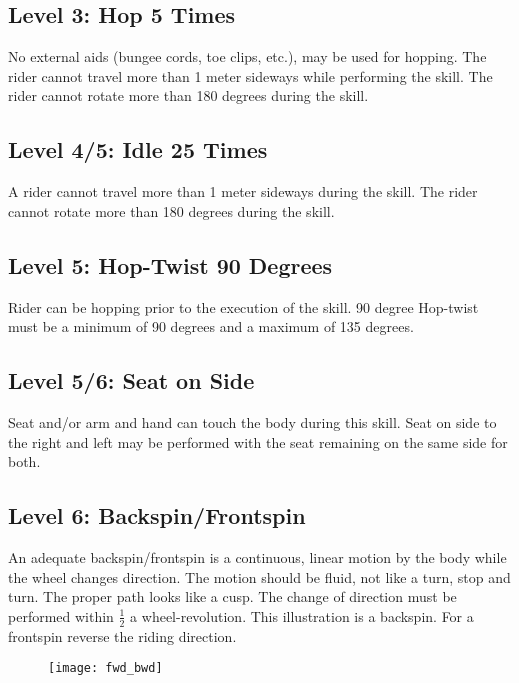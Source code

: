 \subsection{Level 3: Hop 5 Times}
No external aids (bungee cords, toe clips, etc.), may be used for hopping.
The rider cannot travel more than 1 meter sideways while performing the skill.
The rider cannot rotate more than 180 degrees during the skill.

\subsection{Level 4/5: Idle 25 Times}
A rider cannot travel more than 1 meter sideways during the skill.
The rider cannot rotate more than 180 degrees during the skill.

\subsection{Level 5: Hop-Twist 90 Degrees}
Rider can be hopping prior to the execution of the skill.
90 degree Hop-twist must be a minimum of 90 degrees and a maximum of 135 degrees.

\subsection{Level 5/6: Seat on Side}
Seat and/or arm and hand can touch the body during this skill.
Seat on side to the right and left may be performed with the seat remaining on the same side for both.

\subsection{Level 6: Backspin/Frontspin}
An adequate backspin/frontspin is a continuous, linear motion by the body while the wheel changes direction.
The motion should be fluid, not like a turn, stop and turn.
The proper path looks like a cusp.
The change of direction must be performed within $\frac{1}{2}$ a wheel-revolution.
This illustration is a backspin.
For a frontspin reverse the riding direction.

\begin{figure}[h]
\begin{center}
\texttt{[image: fwd\_bwd]}
\end{center}
\vspace{-20pt}
\vspace{-10pt}
\end{figure}

